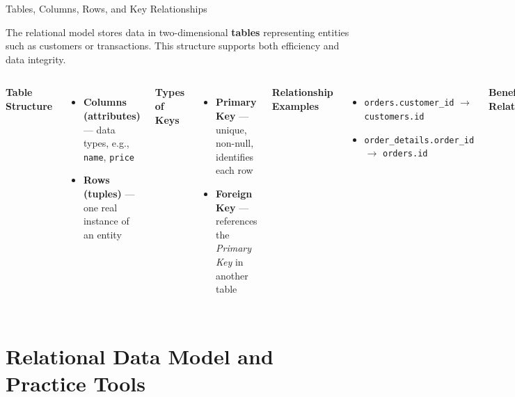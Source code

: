 \documentclass[aspectratio=169, table]{beamer}
\begin{document}
\begin{frame}[fragile]{Tables, Columns, Rows, and Key Relationships}
\vspace{15pt}

The relational model stores data in two-dimensional \textbf{tables} representing entities such as customers or transactions.  
This structure supports both efficiency and data integrity.

\begin{columns}[T]

\textbf{Table Structure}
\begin{itemize}
	\item \textbf{Columns (attributes)} — data types, e.g., \texttt{name}, \texttt{price}
	\item \textbf{Rows (tuples)} — one real instance of an entity
\end{itemize}

\textbf{Types of Keys}
\begin{itemize}
	\item \textbf{Primary Key} — unique, non-null, identifies each row
	\item \textbf{Foreign Key} — references the \emph{Primary Key} in another table
\end{itemize}

\textbf{Relationship Examples}
\begin{itemize}
	\item \texttt{orders.customer\_id} $\rightarrow$ \texttt{customers.id}
	\item \texttt{order\_details.order\_id} $\rightarrow$ \texttt{orders.id}
\end{itemize}

\textbf{Benefits of Relationships}
\begin{itemize}
	\item Supports table \textbf{JOINs}
	\item Minimises data duplication (normalisation)
	\item Simplifies validation and maintenance
\end{itemize}

\end{columns}

\end{frame}


\section{Relational Data Model and Practice Tools}
\end{document}
